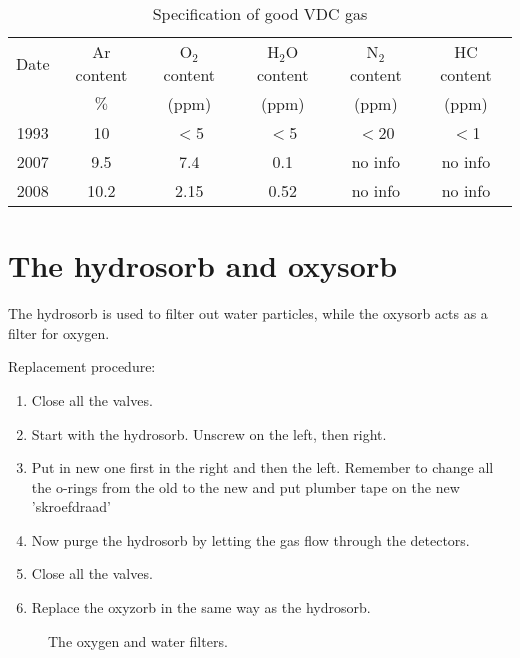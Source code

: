\documentclass[11pt]{report}
\begin{document}
\begin{table}[!ht]
\centering
\begin{tabular}{|c|c|c|c|c|c|}
\hline
Date & Ar content & O$_2$ content & H$_2$O content & N$_2$ content & HC content \\ 
     &  $\%$      &    (ppm)      &    (ppm)       &    (ppm)      &    (ppm)\\
\hline
\hline
1993    & 10   &  $<$5  &            $<$5     &        $<$20     &     $<$1         \\
2007    & 9.5  & 7.4    &         0.1   &         no info   &  no info   \\     
2008    & 10.2  & 2.15   &         0.52   &        no info  &   no info    \\    
\hline
\end{tabular}
\caption{Specification of good VDC gas}
\label{table:goodresolution}
\end{table}


\section{The hydrosorb and oxysorb}

The hydrosorb is used to filter out water particles,
while the oxysorb acts as a filter for oxygen.

Replacement procedure:
\begin{enumerate}
\item Close all the valves.

\item Start with the hydrosorb. Unscrew on the left, then right.

\item Put in new one first in the right and then the left.
Remember to change all the o-rings from the old to the new
and put plumber tape on the new 'skroefdraad'

\item Now purge the hydrosorb by letting the gas flow through the detectors.
\item Close all the valves.

\item Replace the oxyzorb in the same way as the hydrosorb.
\end{enumerate}

\begin{figure}[!ht]
\centerline{\vspace{0cm}\hspace{0cm}
}
\centering
\caption{The oxygen and water filters.}
\label{fig:gas-handling-pic}
\end{figure} 
\end{document}

